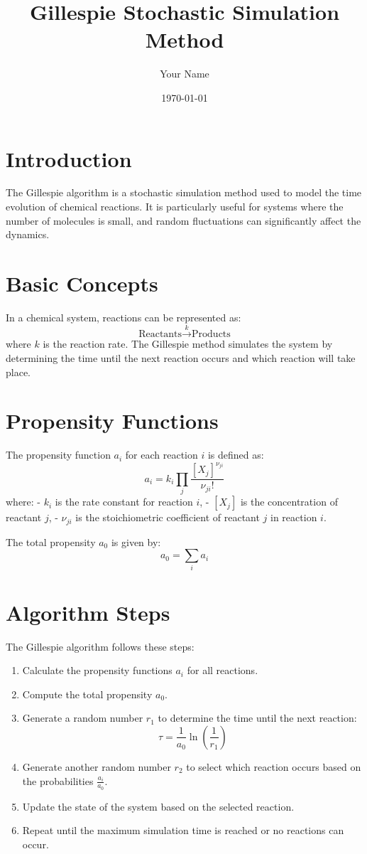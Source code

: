 \documentclass{article}
\title{Gillespie Stochastic Simulation Method}
\author{Your Name}
\date{\today}
\begin{document}
\maketitle

\section{Introduction}
The Gillespie algorithm is a stochastic simulation method used to model the time evolution of chemical reactions. It is particularly useful for systems where the number of molecules is small, and random fluctuations can significantly affect the dynamics.

\section{Basic Concepts}
In a chemical system, reactions can be represented as:
\[
\text{Reactants} \xrightarrow{k} \text{Products}
\]
where \( k \) is the reaction rate. The Gillespie method simulates the system by determining the time until the next reaction occurs and which reaction will take place.

\section{Propensity Functions}
The propensity function \( a_i \) for each reaction \( i \) is defined as:
\[
a_i = k_i \prod_{j} \frac{[X_j]^{\nu_{ji}}}{\nu_{ji}!}
\]
where:
- \( k_i \) is the rate constant for reaction \( i \),
- \( [X_j] \) is the concentration of reactant \( j \),
- \( \nu_{ji} \) is the stoichiometric coefficient of reactant \( j \) in reaction \( i \).

The total propensity \( a_0 \) is given by:
\[
a_0 = \sum_{i} a_i
\]

\section{Algorithm Steps}
The Gillespie algorithm follows these steps:
\begin{enumerate}
    \item Calculate the propensity functions \( a_i \) for all reactions.
    \item Compute the total propensity \( a_0 \).
    \item Generate a random number \( r_1 \) to determine the time until the next reaction:
    \[
    \tau = \frac{1}{a_0} \ln\left(\frac{1}{r_1}\right)
    \]
    \item Generate another random number \( r_2 \) to select which reaction occurs based on the probabilities \( \frac{a_i}{a_0} \).
    \item Update the state of the system based on the selected reaction.
    \item Repeat until the maximum simulation time is reached or no reactions can occur.
\end{enumerate}
\end{document}
